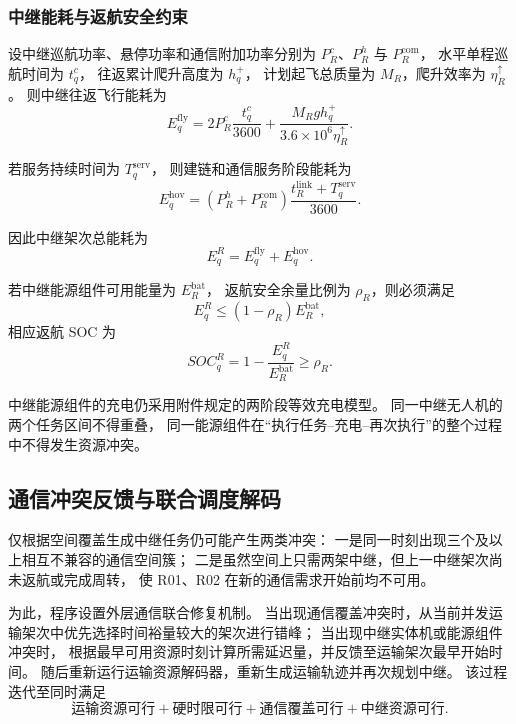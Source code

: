 \subsubsection{中继能耗与返航安全约束}

设中继巡航功率、悬停功率和通信附加功率分别为
$P_R^{c}$、$P_R^{h}$ 与 $P_R^{\mathrm{com}}$，
水平单程巡航时间为 $t_q^{c}$，
往返累计爬升高度为 $h_q^{+}$，
计划起飞总质量为 $M_R$，爬升效率为 $\eta_R^{\uparrow}$。
则中继往返飞行能耗为
\begin{equation}
E_q^{\mathrm{fly}}
=
2P_R^c\frac{t_q^{c}}{3600}
+
\frac{M_Rgh_q^{+}}
{3.6\times10^6\eta_R^{\uparrow}}.
\label{eq:q3-relay-flight-energy}
\end{equation}

若服务持续时间为 $T_q^{\mathrm{serv}}$，
则建链和通信服务阶段能耗为
\begin{equation}
E_q^{\mathrm{hov}}
=
\left(P_R^h+P_R^{\mathrm{com}}\right)
\frac{t_R^{\mathrm{link}}+T_q^{\mathrm{serv}}}{3600}.
\label{eq:q3-relay-hover-energy}
\end{equation}

因此中继架次总能耗为
\begin{equation}
E_q^R
=E_q^{\mathrm{fly}}+E_q^{\mathrm{hov}}.
\label{eq:q3-relay-total-energy}
\end{equation}

若中继能源组件可用能量为 $E_R^{\mathrm{bat}}$，
返航安全余量比例为 $\rho_R$，则必须满足
\begin{equation}
E_q^R\le
(1-\rho_R)E_R^{\mathrm{bat}},
\label{eq:q3-relay-reserve}
\end{equation}
相应返航 SOC 为
\begin{equation}
SOC_q^{R}
=1-\frac{E_q^R}{E_R^{\mathrm{bat}}}
\ge \rho_R.
\label{eq:q3-relay-soc}
\end{equation}

中继能源组件的充电仍采用附件规定的两阶段等效充电模型。
同一中继无人机的两个任务区间不得重叠，
同一能源组件在“执行任务--充电--再次执行”的整个过程中不得发生资源冲突。

\subsection{通信冲突反馈与联合调度解码}

仅根据空间覆盖生成中继任务仍可能产生两类冲突：
一是同一时刻出现三个及以上相互不兼容的通信空间簇；
二是虽然空间上只需两架中继，但上一中继架次尚未返航或完成周转，
使 R01、R02 在新的通信需求开始前均不可用。

为此，程序设置外层通信联合修复机制。
当出现通信覆盖冲突时，从当前并发运输架次中优先选择时间裕量较大的架次进行错峰；
当出现中继实体机或能源组件冲突时，
根据最早可用资源时刻计算所需延迟量，并反馈至运输架次最早开始时间。
随后重新运行运输资源解码器，重新生成运输轨迹并再次规划中继。
该过程迭代至同时满足
\[
\boxed{
\text{运输资源可行}
+\text{硬时限可行}
+\text{通信覆盖可行}
+\text{中继资源可行}
}.
\]

